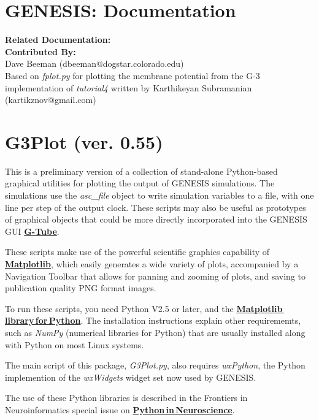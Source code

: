 \documentclass[12pt]{article}
\begin{document}
\section*{GENESIS: Documentation}

{\bf Related Documentation:}
{\\\bf Contributed By:}\\
Dave Beeman (dbeeman@dogstar.colorado.edu)\\
Based on {\it fplot.py} for plotting the membrane potential from the G-3 implementation of {\it tutorial4} written by Karthikeyan Subramanian (kartikznov@gmail.com)

\section*{G3Plot (ver. 0.55)}

This is a preliminary version of a collection of stand-alone Python-based
graphical utilities for plotting the output of GENESIS simulations.  The
simulations use the {\it asc\_file} object to write simulation variables to a
file, with one line per step of the output clock.  These scripts may also
be useful as prototypes of graphical objects that could be more directly
incorporated into the GENESIS GUI \href{../gtube/gtube.tex}{\bf G-Tube}.

These scripts make use of the powerful
scientific graphics capability of \href{http://matplotlib.sourceforge.net/}{\bf Matplotlib}, which easily generates a
wide variety of plots, accompanied by a Navigation Toolbar that allows
for panning and zooming of plots, and saving to publication quality
PNG format images.

To run these scripts, you need Python V2.5 or later,
and the \href{http://sourceforge.net/projects/matplotlib}{\bf Matplotlib\,library\,for\,Python}.  
The installation instructions
explain other requirememts, such as {\it NumPy} (numerical libraries for Python)
that are usually installed along with Python on most Linux systems.

The main script of this package, {\it G3Plot.py}, also requires {\it wxPython}, the
Python implemention of the {\it wxWidgets} widget set now used by GENESIS.

The use of these Python libraries is described in the Frontiers in
Neuroinformatics special issue on \href{http://frontiersin.org/neuroscience/neuroinformatics/specialtopics/8/}{\bf Python\,in\,Neuroscience}.
\end{document}

